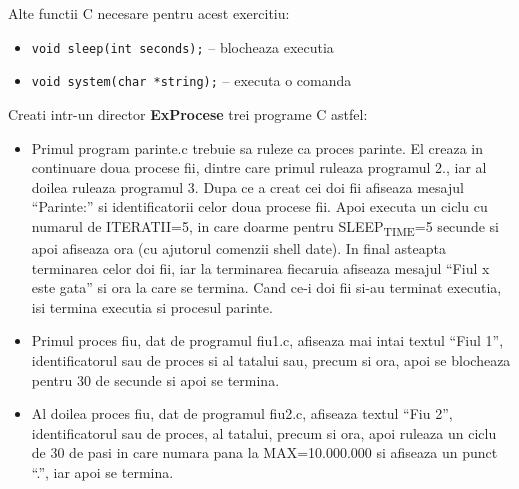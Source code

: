 \documentclass[11pt]{article}
\begin{document}
Alte functii C necesare pentru acest exercitiu:
\begin{itemize}
\item \texttt{void sleep(int seconds);} -- blocheaza executia
\item \texttt{void system(char *string);} -- executa o comanda
\end{itemize}

Creati intr-un director \textbf{ExProcese} trei programe C astfel:
\begin{itemize}
\item Primul program parinte.c trebuie sa ruleze ca proces parinte. El creaza in continuare doua procese fii, dintre care primul ruleaza programul 2., iar al doilea ruleaza programul 3. Dupa ce a creat cei doi fii afiseaza mesajul ``Parinte:'' si identificatorii celor doua procese fii. Apoi executa un ciclu cu numarul de ITERATII=5, in care doarme pentru SLEEP\textsubscript{TIME}=5 secunde si apoi afiseaza ora (cu ajutorul comenzii shell date). In final asteapta terminarea celor doi fii, iar la terminarea fiecaruia afiseaza mesajul ``Fiul x este gata'' si ora la care se termina. Cand ce-i doi fii si-au terminat executia, isi termina executia si procesul parinte.
\item Primul proces fiu, dat de programul fiu1.c, afiseaza mai intai textul ``Fiul 1'', identificatorul sau de proces si al tatalui sau, precum si ora, apoi se blocheaza pentru 30 de secunde si apoi se termina.
\item Al doilea proces fiu, dat de programul fiu2.c, afiseaza textul ``Fiu 2'', identificatorul sau de proces, al tatalui, precum si ora, apoi ruleaza un ciclu de 30 de pasi in care numara pana la MAX=10.000.000 si afiseaza un punct ``.'', iar apoi se termina.
\end{itemize}
\end{document}
